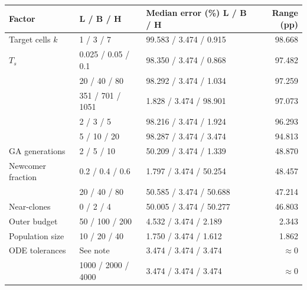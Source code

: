 \begin{table}[htbp]
\centering\small
\caption[Experiment A sensitivity ranking on the Duffing oscillator with quadratic damping]{}
\label{tab:a-sensitivity}
\begingroup{}
\setlength{\tabcolsep}{3.5pt}
\begin{tabularx}{\linewidth}{@{}Y l l r@{}}
\toprule
Factor & L / B / H & Median error (\%) L / B / H & Range (pp) \\
\midrule
Target cells $k$ & 1 / 3 / 7 & 99.583 / 3.474 / 0.915 & 98.668 \\
$T_s$ & 0.025 / 0.05 / 0.1 & 98.350 / 3.474 / 0.868 & 97.482 \\
 & 20 / 40 / 80 & 98.292 / 3.474 / 1.034 & 97.259 \\
 & 351 / 701 / 1051 & 1.828 / 3.474 / 98.901 & 97.073 \\
 & 2 / 3 / 5 & 98.216 / 3.474 / 1.924 & 96.293 \\
 & 5 / 10 / 20 & 98.287 / 3.474 / 3.474 & 94.813 \\
GA generations & 2 / 5 / 10 & 50.209 / 3.474 / 1.339 & 48.870 \\
Newcomer fraction & 0.2 / 0.4 / 0.6 & 1.797 / 3.474 / 50.254 & 48.457 \\
 & 20 / 40 / 80 & 50.585 / 3.474 / 50.688 & 47.214 \\
Near-clones & 0 / 2 / 4 & 50.005 / 3.474 / 50.277 & 46.803 \\
Outer budget & 50 / 100 / 200 & 4.532 / 3.474 / 2.189 & 2.343 \\
Population size & 10 / 20 / 40 & 1.750 / 3.474 / 1.612 & 1.862 \\
ODE tolerances & See note & 3.474 / 3.474 / 3.474 & $\approx0$ \\
 & 1000 / 2000 / 4000 & 3.474 / 3.474 / 3.474 & $\approx0$ \\
\bottomrule
\end{tabularx}\endgroup
\par\smallskip\footnotesize{}
\end{table}
